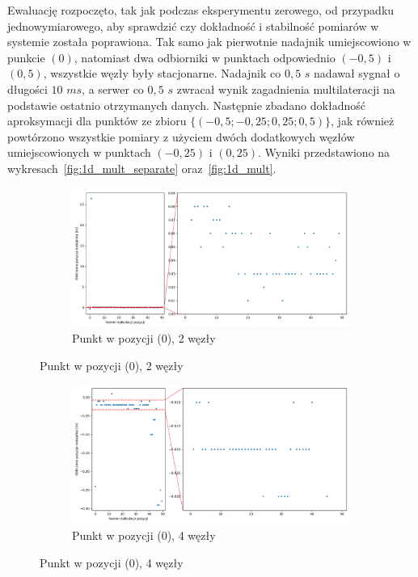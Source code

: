 Ewaluację rozpoczęto, tak jak podczas eksperymentu zerowego, od przypadku jednowymiarowego, aby sprawdzić czy dokładność i stabilność pomiarów w systemie została poprawiona. Tak samo jak pierwotnie nadajnik umiejscowiono w punkcie $(0)$, natomiast dwa odbiorniki w punktach odpowiednio $(-0,5)$ i $(0,5)$, wszystkie węzły były stacjonarne. Nadajnik co $0,5$ $s$ nadawał sygnał o długości $10$ $ms$, a serwer co $0,5$ $s$ zwracał wynik zagadnienia multilateracji na podstawie ostatnio otrzymanych danych. Następnie zbadano dokładność aproksymacji dla punktów ze zbioru $\{(-0,5; -0,25; 0,25; 0,5)\}$, jak również powtórzono wszystkie pomiary z użyciem dwóch dodatkowych węzłów umiejscowionych w punktach $(-0,25)$ i $(0,25)$. Wyniki przedstawiono na wykresach~\ref{fig:1d_mult_separate} oraz~\ref{fig:1d_mult}.

\begin{figure}[H]
    \centering
    \begin{subfigure}{\textwidth}
        \centering
        \includegraphics[width=\linewidth]{pics/mult_lat_1d/position_[0]_2.png}
        \caption{Punkt w pozycji (0), 2 węzły}
        \label{pic:1d_mult_[0]_2}
    \end{subfigure}
\end{figure}
\begin{figure}[H]
    \ContinuedFloat\centering
    \begin{subfigure}{\textwidth}
        \centering
        \includegraphics[width=\linewidth]{pics/mult_lat_1d/position_[0]_4.png}
        \caption{Punkt w pozycji (0), 4 węzły}
        \label{pic:1d_mult_[0]_4}
    \end{subfigure}
\end{figure}
